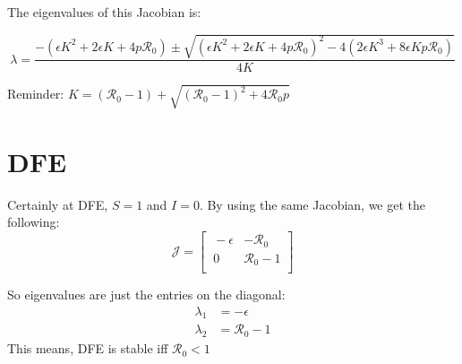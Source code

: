 \documentclass[12pt]{article}
\begin{document}
The eigenvalues of this Jacobian is:

\begin{equation}
\lambda = \frac{-(\epsilon K^2+2\epsilon K +4p\mathcal{R}_0) \pm \sqrt{(\epsilon K^2+2\epsilon K +4p\mathcal{R}_0)^2-4(2\epsilon K^3+8\epsilon Kp\mathcal{R}_0)}}{4K}
\end{equation}

Reminder: $K=(\mathcal{R}_0 -1)+ \sqrt{(\mathcal{R}_0-1)^2+4\mathcal{R}_0 p}$

\section{DFE}
Certainly at DFE, $S=1$ and $I=0$. By using the same Jacobian, we get the following:
\begin{equation}
\mathcal{J} =
\begin{bmatrix}
    \ -\epsilon       & -\mathcal{R}_0 \\
    \ 0       & \mathcal{R}_0 -1 \\
\end{bmatrix}
\end{equation}

So eigenvalues are just the entries on the diagonal:
\begin{align}
\lambda _1 &= -\epsilon\\
\lambda _2 &= \mathcal{R}_0 -1
\end{align}
This means, DFE is stable iff $\mathcal{R}_0<1$
\end{document}
